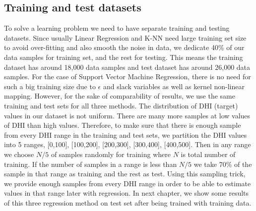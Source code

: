 \subsection{Training and test datasets}
To solve a learning problem we need to have separate training and testing datasets. Since usually Linear Regression and K-NN need large training set size to avoid over-fitting and also smooth the noise in data, we dedicate 40\% of our data samples for training set, and the rest for testing. This means the training dataset has around 18,000 data samples and test dataset has around 26,000 data samples. For the case of Support Vector Machine Regression, there is no need for such a big training size due to $\epsilon$ and slack variables as well as kernel non-linear mapping. However, for the sake of comparability of results, we use the same training and test sets for all three methods. The distribution of DHI (target) values in our dataset is not uniform. There are many more samples at low values of DHI than high values. Therefore, to make sure that there is enough sample from every DHI range in the training and test sets, we partition the DHI values into 5 ranges, [0,100], [100,200], [200,300], [300,400], [400,500]. Then in any range we choose $N/5$ of samples randomly for training where $N$ is total number of training. If the number of samples in a range is less than $N/5$ we take 70\% of the sample in that range as training and the rest as test. Using this sampling trick, we provide enough samples from every DHI range in order to be able to estimate values in that range later with regression. In next chapter, we show some results of this three regression method on test set after being trained with training data.